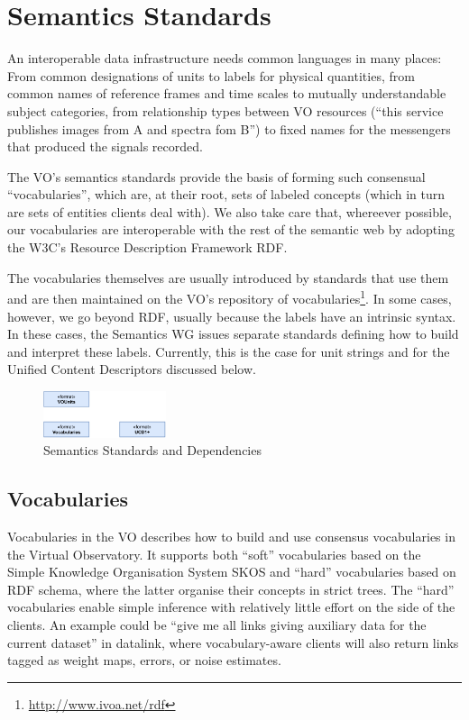 \documentclass[11pt,letter]{ivoa}
\begin{document}
\section{Semantics Standards}

An interoperable data infrastructure needs common languages in many
places: From common designations of units to labels for physical
quantities, from common names of reference frames and time scales to
mutually understandable subject categories, from relationship types
between VO resources (``this service publishes images from A and spectra
fom B'') to fixed names for the messengers that produced the signals
recorded.

The VO's semantics standards provide the basis of forming such
consensual ``vocabularies'', which are, at their root, sets of labeled
concepts (which in turn are sets of entities clients deal with).  We
also take care that, whereever possible, our vocabularies are
interoperable with the rest of the semantic web by adopting the W3C's
Resource Description Framework RDF.

The vocabularies themselves are usually introduced by standards that use
them and are then maintained on the VO's repository of
vocabularies\footnote{\url{http://www.ivoa.net/rdf}}.  In some cases,
however, we go beyond RDF, usually because the labels have an intrinsic
syntax.  In these cases, the Semantics WG issues separate standards
defining how to build and interpret these labels.  Currently, this is
the case for unit strings and for the Unified Content Descriptors
discussed below.

\begin{figure}[ht]
\centering
\includegraphics[width=0.32\textwidth]{ivoa-arch-semantics.pdf}
\caption{Semantics Standards and Dependencies}
\label{fig:semdeps}
\end{figure}

\subsection{Vocabularies}

Vocabularies in the VO \citep{2021ivoa.spec.0525D} describes how to build and use
consensus vocabularies in the Virtual Observatory.  It supports both
``soft'' vocabularies based on the Simple Knowledge Organisation System
SKOS and ``hard'' vocabularies based on RDF schema, where the latter
organise their concepts in strict trees.  The ``hard'' vocabularies
enable simple inference with relatively little effort on the side of
the clients.  An example could be ``give me all links giving auxiliary
data for the current dataset'' in datalink, where vocabulary-aware
clients will also return links tagged as weight maps, errors, or noise
estimates.
\end{document}
